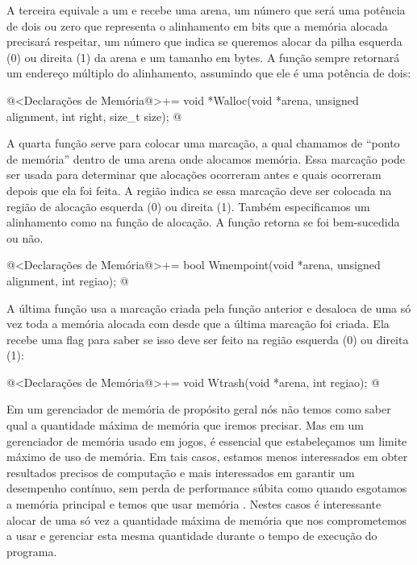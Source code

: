 A terceira equivale a um  e recebe uma arena, um
número que será uma potência de dois ou zero que representa o
alinhamento em bits que a memória alocada precisará respeitar, um
número que indica se queremos alocar da pilha esquerda (0) ou direita
(1) da arena e um tamanho em bytes. A função sempre retornará um
endereço múltiplo do alinhamento, assumindo que ele é uma potência
de dois:

\iniciocodigo
@<Declarações de Memória@>+=
void *Walloc(void *arena, unsigned alignment, int right, size_t size);
@
\fimcodigo

A quarta função serve para colocar uma marcação, a qual chamamos de
``ponto de memória'' dentro de uma arena onde alocamos memória. Essa
marcação pode ser usada para determinar que alocações ocorreram antes
e quais ocorreram depois que ela foi feita. A região indica se essa
marcação deve ser colocada na região de alocação esquerda (0) ou
direita (1). Também especificamos um alinhamento como na função de
alocação. A função retorna se foi bem-sucedida ou não.

\iniciocodigo
@<Declarações de Memória@>+=
bool Wmempoint(void *arena, unsigned alignment, int regiao);
@
\fimcodigo

A última função usa a marcação criada pela função anterior e desaloca
de uma só vez toda a memória alocada com  desde que
a última marcação foi criada. Ela recebe uma flag para saber se isso
deve ser feito na região esquerda (0) ou direita (1):

\iniciocodigo
@<Declarações de Memória@>+=
void Wtrash(void *arena, int regiao);
@
\fimcodigo



Em um gerenciador de memória de propósito geral nós não temos como
saber qual a quantidade máxima de memória que iremos precisar. Mas em
um gerenciador de memória usado em jogos, é essencial que
estabeleçamos um limite máximo de uso de memória. Em tais casos,
estamos menos interessados em obter resultados precisos de computação
e mais interessados em garantir um desempenho contínuo, sem perda de
performance súbita como quando esgotamos a memória principal e temos
que usar memória . Nestes casos é interessante alocar de
uma só vez a quantidade máxima de memória que nos comprometemos a usar
e gerenciar esta mesma quantidade durante o tempo de execução do
programa.

